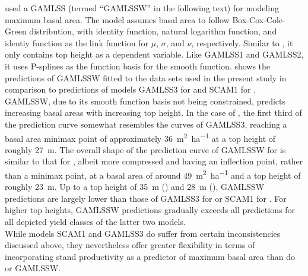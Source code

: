 \textcite{Woerdehoff2016} used a GAMLSS (termed “GAMLSSW” in the following text) for modeling maximum basal area.  The model assumes basal area to follow Box-Cox-Cole-Green distribution, with identity function, natural logarithm function, and identiy function as the link function for \(\mu\), \(\sigma\), and \(\nu\), respectively.  Similar to , it only contains top height as a dependent variable.  Like GAMLSS1 and GAMLSS2, it uses P-splines as the function basis for the smooth function.   shows the predictions of GAMLSSW fitted to the data sets used in the present study in comparison to predictions of models GAMLSS3 for \Beech{} and SCAM1 for \Spruce{}.  GAMLSSW, due to its smooth function basis not being constrained, predicts increasing basal areas with increasing top height.  In the case of \Beech{}, the first third of the prediction curve somewhat resembles the curves of GAMLSS3, reaching a basal area minimax point of approximately \SI{36}{\square\meter\per\hectare} at a top height of roughly \SI{27}{\meter}.  The overall shape of the  prediction curve of GAMLSSW for \Spruce{} is similar to that for \Beech{}, albeit more compressed and having an inflection point, rather than a minimax point, at a basal area of around \SI{49}{\square\meter\per\hectare} and a top height of roughly \SI{23}{\meter}.  Up to a top height of \SI{35}{\meter} (\Beech{}) and \SI{28}{\meter} (\Spruce{}), GAMLSSW predictions are largely lower than those of GAMLSS3 for \Beech{} or SCAM1 for \Spruce{}.  For higher top heights, GAMLSSW predictions gradually exceeds all predictions for all depicted yield classes of the latter two models.  \\
While models SCAM1 and GAMLSS3 do suffer from certain inconsistencies discussed above, they nevertheless offer greater flexibility in terms of incorporating stand productivity as a predictor of maximum basal area than do  or GAMLSSW.

